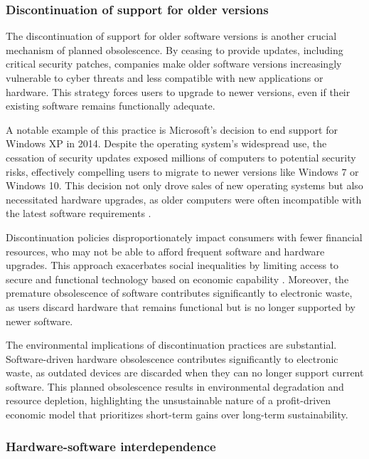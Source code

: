 \begin{refsection}
\subsubsection{Discontinuation of support for older versions}

The discontinuation of support for older software versions is another crucial mechanism of planned obsolescence. By ceasing to provide updates, including critical security patches, companies make older software versions increasingly vulnerable to cyber threats and less compatible with new applications or hardware. This strategy forces users to upgrade to newer versions, even if their existing software remains functionally adequate.

A notable example of this practice is Microsoft’s decision to end support for Windows XP in 2014. Despite the operating system’s widespread use, the cessation of security updates exposed millions of computers to potential security risks, effectively compelling users to migrate to newer versions like Windows 7 or Windows 10. This decision not only drove sales of new operating systems but also necessitated hardware upgrades, as older computers were often incompatible with the latest software requirements \cite[pp.~202-205]{foster2009crises}.

Discontinuation policies disproportionately impact consumers with fewer financial resources, who may not be able to afford frequent software and hardware upgrades. This approach exacerbates social inequalities by limiting access to secure and functional technology based on economic capability \cite[pp.~113-116]{schiller2000digital}. Moreover, the premature obsolescence of software contributes significantly to electronic waste, as users discard hardware that remains functional but is no longer supported by newer software.

The environmental implications of discontinuation practices are substantial. Software-driven hardware obsolescence contributes significantly to electronic waste, as outdated devices are discarded when they can no longer support current software. This planned obsolescence results in environmental degradation and resource depletion, highlighting the unsustainable nature of a profit-driven economic model that prioritizes short-term gains over long-term sustainability.

\subsubsection{Hardware-software interdependence}


\end{refsection}
